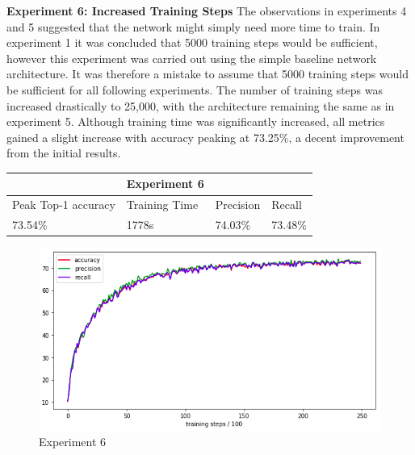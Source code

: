 \documentclass[12pt]{report}
\begin{document}
\newpage
\begin{flushleft}
\vspace{0.5cm}
\textbf{Experiment 6: Increased Training Steps}
\linebreak
The observations in experiments 4 and 5 suggested that the network might simply need more time to train. In experiment 1 it was concluded that 5000 training steps would be sufficient, however this experiment was carried out using the simple baseline network architecture. It was therefore a mistake to assume that 5000 training steps would be sufficient for all following experiments. The number of training steps was increased drastically to 25,000, with the architecture remaining the same as in experiment 5. Although training time was significantly increased, all metrics gained a slight increase with accuracy peaking at 73.25\%, a decent improvement from the initial results.

\vspace{0.5cm}
\begin{tabular}{llll}
                                          & \multicolumn{1}{c}{Experiment 6}   &                                &                              \\ \hline
\multicolumn{1}{|l|}{Peak Top-1 accuracy} & \multicolumn{1}{l|}{Training Time} & \multicolumn{1}{l|}{Precision} & \multicolumn{1}{l|}{Recall}  \\ \hline
\multicolumn{1}{|l|}{73.54\%}             & \multicolumn{1}{l|}{1778s}         & \multicolumn{1}{l|}{74.03\%}   & \multicolumn{1}{l|}{73.48\%} \\ \hline
\end{tabular}

\vspace{0.5cm}
\begin{figure}[ht!]
	\centering
	\includegraphics[width=12cm]{experiment-6}
	\caption{Experiment 6}
	\label{fig:experiment-6}
\end{figure}

\end{flushleft}
\end{document}
